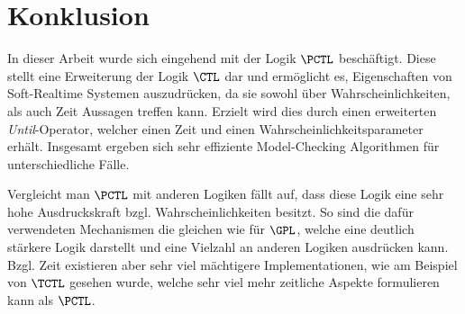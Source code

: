 \section{Konklusion}

In dieser Arbeit wurde sich eingehend mit der Logik $\PCTL$ beschäftigt.
Diese stellt eine Erweiterung der Logik $\CTL$ dar und ermöglicht es, Eigenschaften von Soft-Realtime Systemen auszudrücken, da sie sowohl über Wahrscheinlichkeiten, als auch Zeit Aussagen treffen kann.
Erzielt wird dies durch einen erweiterten \textit{Until}-Operator, welcher einen Zeit und einen Wahrscheinlichkeitsparameter erhält.
Insgesamt ergeben sich sehr effiziente Model-Checking Algorithmen für unterschiedliche Fälle.

Vergleicht man $\PCTL$ mit anderen Logiken fällt auf, dass diese Logik eine sehr hohe Ausdruckskraft bzgl. Wahrscheinlichkeiten besitzt.
So sind die dafür verwendeten Mechanismen die gleichen wie für $\GPL$, welche eine deutlich stärkere Logik darstellt und eine Vielzahl an anderen Logiken ausdrücken kann.
Bzgl. Zeit existieren aber sehr viel mächtigere Implementationen, wie am Beispiel von $\TCTL$ gesehen wurde, welche sehr viel mehr zeitliche Aspekte formulieren kann als $\PCTL$.

